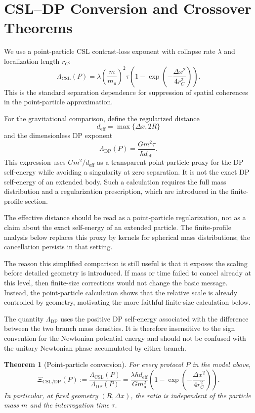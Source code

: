 \documentclass[
  aps,
  prd,
  preprint,
  notitlepage,
  superscriptaddress,
  nofootinbib,
  longbibliography
]{revtex4-2}
\newtheorem{theorem}{Theorem}
\newcommand{\amu}{m_{\mathrm u}}
\newcommand{\dx}{\Delta x}
\newcommand{\Lcsl}{\Lambda_{\mathrm{CSL}}}
\newcommand{\Ldp}{\Lambda_{\mathrm{DP}}}
\newcommand{\Xic}{\Xi_{\mathrm{CSL/DP}}}
\begin{document}
\section{CSL--DP Conversion and Crossover Theorems}
\label{sec:conversion_and_crossover}
We use a point-particle CSL contrast-loss exponent with collapse rate $\lambda$ and localization length $r_C$:
\[
\Lcsl(P)=\lambda\left(\frac{m}{\amu}\right)^2\tau
\left(1-\exp\!\left(-\frac{\dx^2}{4r_C^2}\right)\right).
\]
This is the standard separation dependence for suppression of spatial coherences in the point-particle approximation.

For the gravitational comparison, define the regularized distance
\[
d_{\mathrm{eff}}=\max\{\dx,2R\}
\]
and the dimensionless DP exponent
\[
\Ldp(P)=\frac{Gm^2\tau}{\hbar d_{\mathrm{eff}}}.
\]
This expression uses $Gm^2/d_{\mathrm{eff}}$ as a transparent point-particle proxy for the DP self-energy while avoiding a singularity at zero separation. It is not the exact DP self-energy of an extended body. Such a calculation requires the full mass distribution and a regularization prescription, which are introduced in the finite-profile section.

The effective distance should be read as a point-particle regularization, not as a claim about the exact self-energy of an extended particle. The finite-profile analysis below replaces this proxy by kernels for spherical mass distributions; the cancellation persists in that setting.

The reason this simplified comparison is still useful is that it exposes the scaling before detailed geometry is introduced. If mass or time failed to cancel already at this level, then finite-size corrections would not change the basic message. Instead, the point-particle calculation shows that the relative scale is already controlled by geometry, motivating the more faithful finite-size calculation below.

The quantity $\Ldp$ uses the positive DP self-energy associated with the difference between the two branch mass densities. It is therefore insensitive to the sign convention for the Newtonian potential energy and should not be confused with the unitary Newtonian phase accumulated by either branch.

\begin{theorem}[Point-particle conversion]
For every protocol $P$ in the model above,
\[
\Xic(P):=\frac{\Lcsl(P)}{\Ldp(P)}
=\frac{\lambda\hbar d_{\mathrm{eff}}}{G\amu^2}
\left(1-\exp\!\left(-\frac{\dx^2}{4r_C^2}\right)\right).
\]
In particular, at fixed geometry $(R,\dx)$, the ratio is independent of the particle mass $m$ and the interrogation time $\tau$.
\end{theorem}
\end{document}
